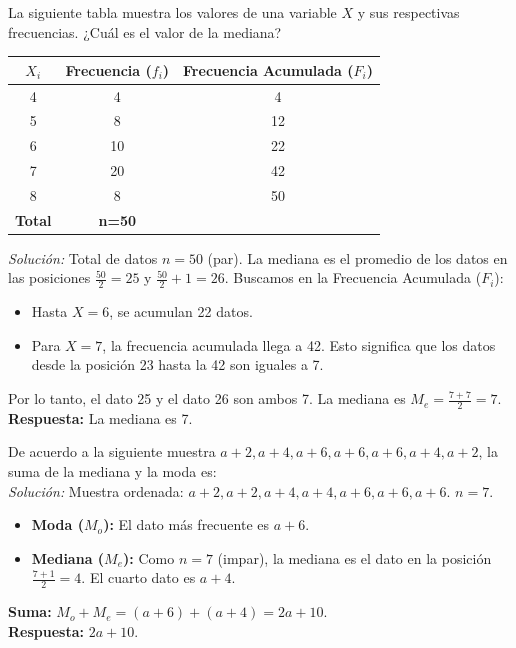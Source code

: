 \documentclass[12pt, letterpaper]{article}
\begin{document}
\vspace{1em}
\noindent La siguiente tabla muestra los valores de una variable \(X\) y sus respectivas frecuencias. ¿Cuál es el valor de la mediana?
\begin{center}
	\begin{tabular}{|c|c|c|}
		\hline
		\textbf{\(X_i\)} & \textbf{Frecuencia ($f_i$)} & \textbf{Frecuencia Acumulada ($F_i$)} \\
		\hline
		4                & 4                           & 4                                     \\ \hline
		5                & 8                           & 12                                    \\ \hline
		6                & 10                          & 22                                    \\ \hline
		7                & 20                          & 42                                    \\ \hline
		8                & 8                           & 50                                    \\ \hline
		\textbf{Total}   & \textbf{n=50}               &                                       \\
		\hline
	\end{tabular}
\end{center}
\textit{Solución:}
Total de datos $n=50$ (par). La mediana es el promedio de los datos en las posiciones $\frac{50}{2}=25$ y $\frac{50}{2}+1 = 26$.
Buscamos en la Frecuencia Acumulada ($F_i$):
\begin{itemize}
	\item Hasta $X=6$, se acumulan 22 datos.
	\item Para $X=7$, la frecuencia acumulada llega a 42. Esto significa que los datos desde la posición 23 hasta la 42 son iguales a 7.
\end{itemize}
Por lo tanto, el dato 25 y el dato 26 son ambos 7.
La mediana es $M_e = \frac{7+7}{2} = 7$. \\
\textbf{Respuesta:} La mediana es 7.

\vspace{1em}
\noindent De acuerdo a la siguiente muestra \(a+2, a+4, a+6, a+6, a+6, a+4, a+2\), la suma de la mediana y la moda es: \\
\textit{Solución:}
Muestra ordenada: \(a+2, a+2, a+4, a+4, a+6, a+6, a+6\). $n=7$.
\begin{itemize}
	\item \textbf{Moda ($M_o$):} El dato más frecuente es \(a+6\).
	\item \textbf{Mediana ($M_e$):} Como $n=7$ (impar), la mediana es el dato en la posición $\frac{7+1}{2}=4$. El cuarto dato es \(a+4\).
\end{itemize}
\textbf{Suma:} $M_o + M_e = (a+6) + (a+4) = 2a+10$.\\
\textbf{Respuesta:} $2a+10$.
\end{document}
